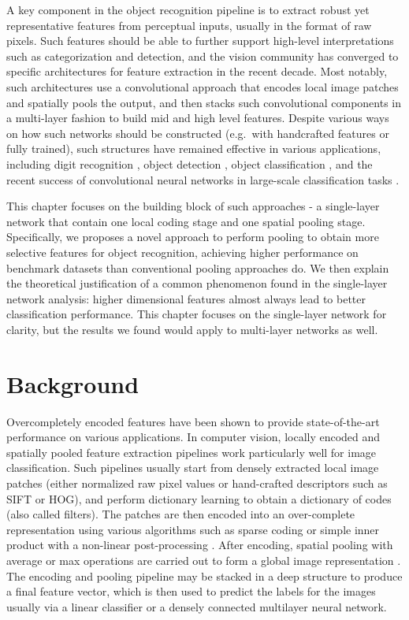 
A key component in the object recognition pipeline is to extract robust yet representative features from perceptual inputs, usually in the format of raw pixels. Such features should be able to further support high-level interpretations such as categorization and detection, and the vision community has converged to specific architectures for feature extraction in the recent decade. Most notably, such architectures use a convolutional approach that encodes local image patches and spatially pools the output, and then stacks such convolutional components in a multi-layer fashion to build mid and high level features. Despite various ways on how such networks should be constructed (e.g.\ with handcrafted features or fully trained), such structures have remained effective in various applications, including digit recognition \cite{lecun1998gradient}, object detection \cite{Dalal:2005to}, object classification \cite{Yang:2009vb}, and the recent success of convolutional neural networks in large-scale classification tasks \cite{krizhevsky2012imagenet}.

This chapter focuses on the building block of such approaches - a single-layer network that contain one local coding stage and one spatial pooling stage. Specifically, we proposes a novel approach to perform pooling to obtain more selective features for object recognition, achieving higher performance on benchmark datasets than conventional pooling approaches do. We then explain the theoretical justification of a common phenomenon found in the single-layer network analysis: higher dimensional features almost always lead to better classification performance. This chapter focuses on the single-layer network for clarity, but the results we found would apply to multi-layer networks as well.

\section{Background}

Overcompletely encoded features have been shown to provide state-of-the-art performance on various applications. In computer vision, locally encoded and spatially pooled feature extraction pipelines work particularly well for image classification. Such pipelines usually start from densely extracted local image patches (either normalized raw pixel values or hand-crafted descriptors such as SIFT or HOG), and perform dictionary learning to obtain a dictionary of codes (also called filters). The patches are then encoded into an over-complete representation using various algorithms such as sparse coding \cite{Olshausen:1997uh,wang2010locality} or simple inner product with a non-linear post-processing \cite{coates2011icml,krizhevsky2012imagenet}. After encoding, spatial pooling with average or max operations are carried out to form a global image representation \cite{Yang:2009vb,Boureau:uq}. The encoding and pooling pipeline may be stacked in a deep structure to produce a final feature vector, which is then used to predict the labels for the images usually via a linear classifier or a densely connected multilayer neural network.


